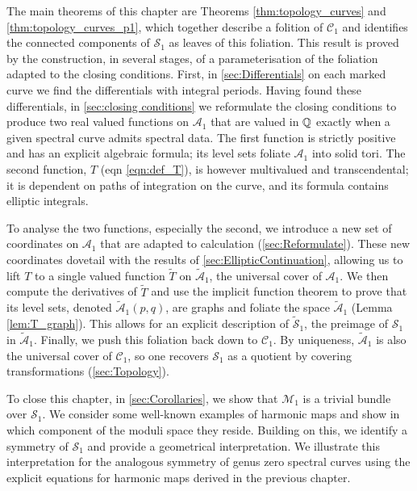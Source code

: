 The main theorems of this chapter are Theorems \ref{thm:topology_curves} and \ref{thm:topology_curves_p1}, which together describe a folition of $\mathcal{C}_1$ and identifies the connected components of $\mathcal{S}_1$ as leaves of this foliation. This result is proved by the construction, in several stages, of a parameterisation of the foliation adapted to the closing conditions. First, in \textsection\ref{sec:Differentials} on each marked curve we find the differentials with integral periods. Having found these differentials, in \textsection\ref{sec:closing conditions} we reformulate the closing conditions to produce two real valued functions on $\mathcal{A}_1$ that are valued in $\Q$ exactly when a given spectral curve admits spectral data. The first function is strictly positive and has an explicit algebraic formula; its level sets foliate $\mathcal{A}_1$ into solid tori. The second function, $T$ (eqn \eqref{eqn:def_T}), is however multivalued and transcendental; it is dependent on paths of integration on the curve, and its formula contains elliptic integrals.

To analyse the two functions, especially the second, we introduce a new set of coordinates on $\mathcal{A}_1$ that are adapted to calculation (\textsection\ref{sec:Reformulate}). These new coordinates dovetail with the results of \textsection\ref{sec:EllipticContinuation}, allowing us to lift $T$ to a  single valued function $\tilde{T}$ on $\mathcal{\tilde{A}}_1$, the universal cover of $\mathcal{A}_1$. We then compute the derivatives of $\tilde{T}$ and use the implicit function theorem to prove that its level sets, denoted $\mathcal{\tilde{A}}_1(p,q)$, are graphs and foliate the space $\mathcal{\tilde{A}}_1$ (Lemma \ref{lem:T_graph}). This allows for an explicit description of $\mathcal{\tilde{S}}_1$, the preimage of $\mathcal{S}_1$ in $\mathcal{\tilde{A}}_1$. Finally, we push this foliation back down to $\mathcal{C}_1$. By uniqueness, $\mathcal{\tilde{A}}_1$ is also the universal cover of $\mathcal{C}_1$, so one recovers $\mathcal{S}_1$ as a quotient by covering transformations (\textsection\ref{sec:Topology}).

To close this chapter, in \textsection\ref{sec:Corollaries}, we show that $\mathcal{M}_1$ is a trivial bundle over $\mathcal{S}_1$. We consider some well-known examples of harmonic maps and show in which component of the moduli space they reside. Building on this, we identify a symmetry of $\mathcal{S}_1$ and provide a geometrical interpretation. We illustrate this interpretation for the analogous symmetry of genus zero spectral curves using the explicit equations for harmonic maps derived in the previous chapter.

